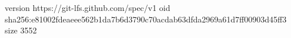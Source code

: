 version https://git-lfs.github.com/spec/v1
oid sha256:e81002fdeaeee562b1da7b6d3790c70acdab63dfda2969a61d7ff00903d45ff3
size 3552
